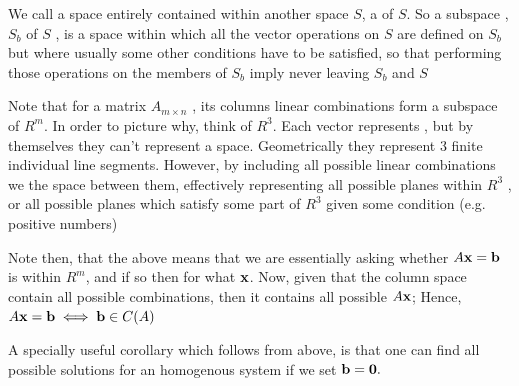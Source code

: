 \documentclass[english,course]{Notes}
\begin{document}
	      	
	      	\par{We call a space entirely contained within another space $S$, a  of $S$. So a subspace , $S_{b}$ of $S$ , is a space within which all the vector operations on $S$ are defined on $S_{b}$ but where usually some other conditions have to be satisfied, so that performing those operations on the members of $S_{b}$ imply never leaving $S_{b}$ and $S$ }
	      	
	      	\par{Note that for a matrix $A_{m \times n}$ , its columns linear combinations form a subspace of $R^{m}$. In order to picture why, think of $R^{3}$. Each vector represents  , but by themselves they can't represent a space. Geometrically they represent 3 finite individual line segments. However, by including all possible linear combinations we  the space between them, effectively representing all possible planes within $R^{3}$ , or all possible planes which satisfy some part of $R^{3}$ given some condition (e.g. positive numbers) }
	      	
	      	
	      	\par{Note then, that the above means that we are essentially asking whether $A\mathbf{x} = \mathbf{b}$ is within $R^{m}$, and if so then for what $\mathbf{x}$. Now, given that the column space  contain all possible combinations, then it contains all possible $A\mathbf{x}$; Hence,  $A\mathbf{x} = \mathbf{b} \iff \mathbf{b} \in C(A)$ }
	      	
	      	
	      	\par{A specially useful corollary which follows from above, is that one can find all possible solutions for an homogenous system if we set $\mathbf{b} = \mathbf{0}.$}
	      	
	      	
	      	\newpage
\end{document}
